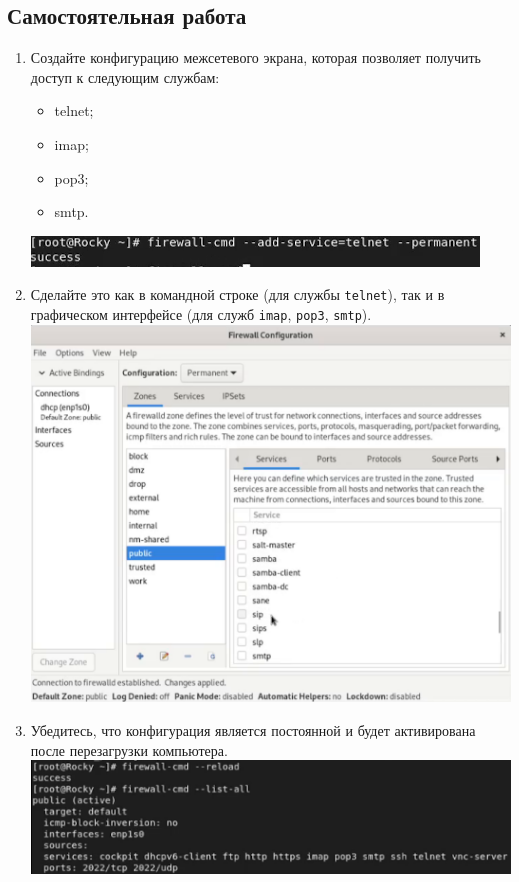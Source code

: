\documentclass[12pt]{article}
\begin{document}
\subsection{Самостоятельная работа}
\begin{enumerate}
	\item Создайте конфигурацию межсетевого экрана, которая позволяет получить доступ
	      к следующим службам:
	      \begin{itemize}
		      \item telnet;
		      \item imap;
		      \item pop3;
		      \item smtp.
	      \end{itemize}
	      \includegraphics{15.png}
	\item Сделайте это как в командной строке (для службы \texttt{telnet}), так и в графическом
	      интерфейсе (для служб \texttt{imap}, \texttt{pop3}, \texttt{smtp}).
	      \\\includegraphics{16.png}
	\item Убедитесь, что конфигурация является постоянной и будет активирована после перезагрузки компьютера.
	      \\\includegraphics{17.png}
\end{enumerate}
\end{document}
